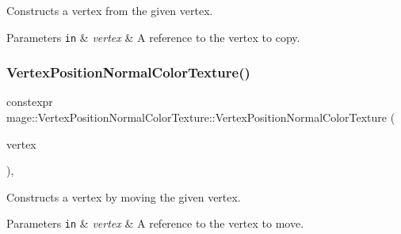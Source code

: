 Constructs a vertex from the given vertex.


\begin{DoxyParams}[1]{Parameters}
\mbox{\tt in}  & {\em vertex} & A reference to the vertex to copy. \\
\hline
\end{DoxyParams}
\hypertarget{structmage_1_1_vertex_position_normal_color_texture_ae453b2d23359d907f13a377d03221a0a}{}\label{structmage_1_1_vertex_position_normal_color_texture_ae453b2d23359d907f13a377d03221a0a} 
\subsubsection{\texorpdfstring{Vertex\+Position\+Normal\+Color\+Texture()}{VertexPositionNormalColorTexture()}\hspace{0.1cm}{\footnotesize\ttfamily [4/4]}}
{\footnotesize\ttfamily constexpr mage\+::\+Vertex\+Position\+Normal\+Color\+Texture\+::\+Vertex\+Position\+Normal\+Color\+Texture (\begin{DoxyParamCaption}\item[{\hyperlink{structmage_1_1_vertex_position_normal_color_texture}{Vertex\+Position\+Normal\+Color\+Texture} \&\&}]{vertex }\end{DoxyParamCaption})\hspace{0.3cm}{\ttfamily [default]}, {\ttfamily [noexcept]}}

Constructs a vertex by moving the given vertex.


\begin{DoxyParams}[1]{Parameters}
\mbox{\tt in}  & {\em vertex} & A reference to the vertex to move. \\
\hline
\end{DoxyParams}
\hypertarget{structmage_1_1_vertex_position_normal_color_texture_af3538a12eab74715dd9b5256f8765162}{}\label{structmage_1_1_vertex_position_normal_color_texture_af3538a12eab74715dd9b5256f8765162} 
